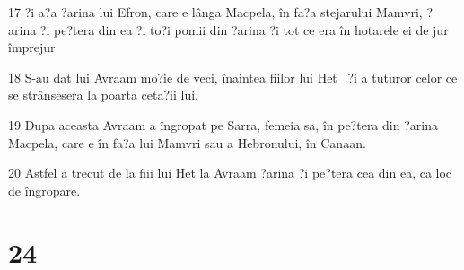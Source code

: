 \par 17 ?i a?a ?arina lui Efron, care e lânga Macpela, în fa?a stejarului Mamvri, ?arina ?i pe?tera din ea ?i to?i pomii din ?arina ?i tot ce era în hotarele ei de jur împrejur
\par 18 S-au dat lui Avraam mo?ie de veci, înaintea fiilor lui Het  ?i a tuturor celor ce se strânsesera la poarta ceta?ii lui.
\par 19 Dupa aceasta Avraam a îngropat pe Sarra, femeia sa, în pe?tera din ?arina Macpela, care e în fa?a lui Mamvri sau a Hebronului, în Canaan.
\par 20 Astfel a trecut de la fiii lui Het la Avraam ?arina ?i pe?tera cea din ea, ca loc de îngropare.

\chapter{24}

